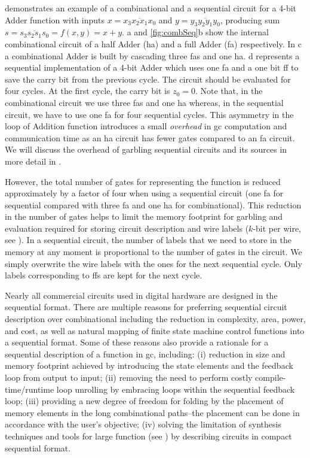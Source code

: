  demonstrates an example of a combinational and a sequential circuit for a 4-bit Adder function with inputs $x = \overline{x_3x_2x_1x_0}$ and $y = \overline{y_3y_2y_1y_0}$, producing sum $s = \overline{s_3s_2s_1s_0} = f(x, y) = x + y$.
a and \ref{fig:combSeq}b show the internal combinational circuit of a half Adder (\acrshort{ha}) and a full Adder (\acrshort{fa}) respectively.
In c a combinational Adder is built by cascading three \acrshort{fa}s and one \acrshort{ha}.
d represents a sequential implementation of a 4-bit Adder which uses one \acrshort{fa} and a one bit \acrshort{ff} to save the carry bit from the previous cycle.
The circuit should be evaluated for four cycles.
At the first cycle, the carry bit is $z_0=0$.
Note that, in the combinational circuit we use three \acrshort{fa}s and one \acrshort{ha} whereas, in the sequential circuit, we have to use one \acrshort{fa} for four sequential cycles.
This asymmetry in the loop of Addition function introduces a small \emph{overhead} in \acrshort{gc} computation and communication time as an \acrshort{ha} circuit has fewer gates compared to an \acrshort{fa} circuit.
We will discuss the overhead of garbling sequential circuits and its sources in more detail in .

However, the total number of gates for representing the function is reduced approximately by a factor of four when using a sequential circuit (one \acrshort{fa} for sequential compared with three \acrshort{fa} and one \acrshort{ha} for combinational).
This reduction in the number of gates helps to limit the memory footprint for garbling and evaluation required for storing circuit description and wire labels ($k$-bit per wire, see ).
In a sequential circuit, the number of labels that we need to store in the memory at any moment is proportional to the number of gates in the circuit.
We simply overwrite the wire labels with the ones for the next sequential cycle.
Only labels corresponding to \acrshort{ff}s are kept for the next cycle.

Nearly all commercial circuits used in digital hardware are designed in the sequential format.
There are multiple reasons for preferring sequential circuit description over combinational including the reduction in complexity, area, power, and cost, as well as natural mapping of finite state machine control functions into a sequential format.
Some of these reasons also provide a rationale for a sequential description of a function in \acrshort{gc}, including: (i) reduction in size and memory footprint achieved by introducing the state elements and the feedback loop from output to input; (ii) removing the need to perform costly compile-time/runtime loop unrolling by embracing loops within the sequential feedback loop; (iii) providing a new degree of freedom for folding by the placement of memory elements in the long combinational paths--the placement can be done in accordance with the user's objective; (iv) solving the limitation of synthesis techniques and tools for large function (see ) by describing circuits in compact sequential format.

